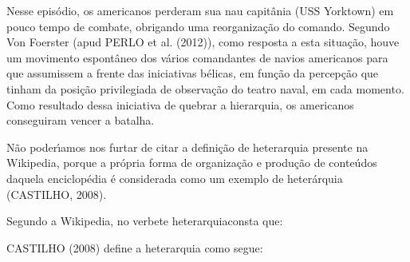 \documentclass[
12pt,		%
openright,	%
twoside,  %
a4paper,			%
chapter=TITLE,		%
english,			%
french,				%
spanish,			%
brazil				%
]{USPSC-classe/USPSC}
\begin{document}
Nesse epis\'odio, os americanos perderam sua nau capit\^ania (USS Yorktown) em pouco tempo de combate, obrigando uma reorganiza\c{c}\~ao do comando. Segundo Von Foerster (apud  PERLO et al. (2012)), como resposta a esta situa\c{c}\~ao, houve um movimento espont\^aneo dos v\'arios comandantes de navios americanos para que assumissem a frente das iniciativas b\'elicas, em fun\c{c}\~ao da percep\c{c}\~ao que tinham da posi\c{c}\~ao privilegiada de observa\c{c}\~ao do teatro naval, em cada momento. Como resultado dessa iniciativa de \textquotedbl quebrar a hierarquia\textquotedbl , os americanos conseguiram vencer a batalha.









N\~ao poder\'{\i}amos nos furtar de citar a defini\c{c}\~ao de heterarquia presente na Wikipedia, porque a pr\'opria forma de organiza\c{c}\~ao e produ\c{c}\~ao de conte\'udos daquela enciclop\'edia \'e considerada como um exemplo de heter\'arquia  (CASTILHO, 2008).









Segundo a Wikipedia, no verbete \textquotedbl heterarquia\textquotedbl  consta que:










\noindent\begin{center}\mbox{\centering{}}\end{center}


 CASTILHO (2008) define a heterarquia como segue:










\noindent\begin{center}\mbox{\centering{}}\end{center}
\end{document}
